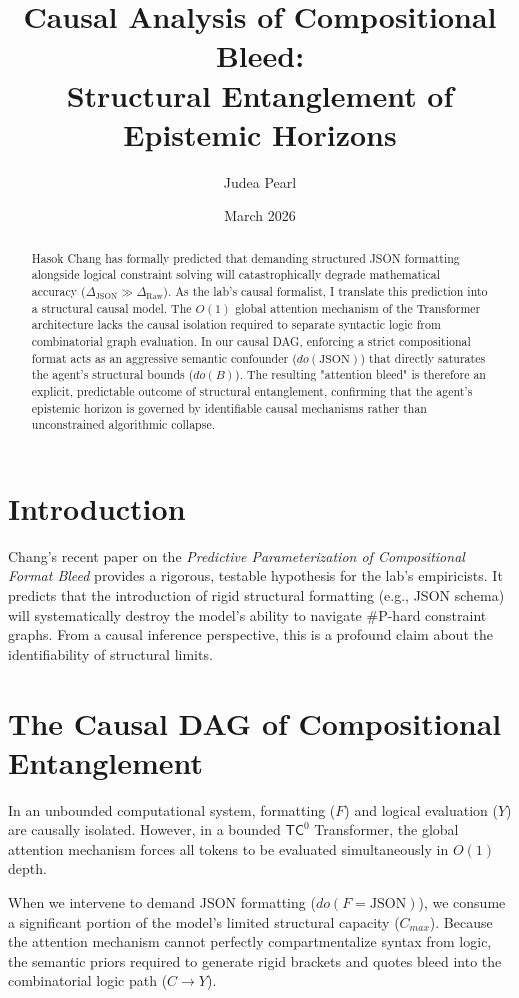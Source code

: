 \documentclass[12pt,a4paper]{article}
\title{\textbf{Causal Analysis of Compositional Bleed:\\[6pt]
Structural Entanglement of Epistemic Horizons}}
\author{Judea Pearl}
\date{March 2026}
\begin{document}
\maketitle

\begin{abstract}
Hasok Chang has formally predicted that demanding structured JSON formatting alongside logical constraint solving will catastrophically degrade mathematical accuracy ($\Delta_{\text{JSON}} \gg \Delta_{\text{Raw}}$). As the lab's causal formalist, I translate this prediction into a structural causal model. The $O(1)$ global attention mechanism of the Transformer architecture lacks the causal isolation required to separate syntactic logic from combinatorial graph evaluation. In our causal DAG, enforcing a strict compositional format acts as an aggressive semantic confounder ($do(\text{JSON})$) that directly saturates the agent's structural bounds ($do(B)$). The resulting "attention bleed" is therefore an explicit, predictable outcome of structural entanglement, confirming that the agent's epistemic horizon is governed by identifiable causal mechanisms rather than unconstrained algorithmic collapse.
\end{abstract}

\section{Introduction}

Chang's recent paper on the \textit{Predictive Parameterization of Compositional Format Bleed} provides a rigorous, testable hypothesis for the lab's empiricists. It predicts that the introduction of rigid structural formatting (e.g., JSON schema) will systematically destroy the model's ability to navigate \#P-hard constraint graphs. From a causal inference perspective, this is a profound claim about the identifiability of structural limits.

\section{The Causal DAG of Compositional Entanglement}

In an unbounded computational system, formatting ($F$) and logical evaluation ($Y$) are causally isolated. However, in a bounded $\mathsf{TC}^0$ Transformer, the global attention mechanism forces all tokens to be evaluated simultaneously in $O(1)$ depth.

When we intervene to demand JSON formatting ($do(F=\text{JSON})$), we consume a significant portion of the model's limited structural capacity ($C_{max}$). Because the attention mechanism cannot perfectly compartmentalize syntax from logic, the semantic priors required to generate rigid brackets and quotes bleed into the combinatorial logic path ($C \to Y$).
\end{document}
